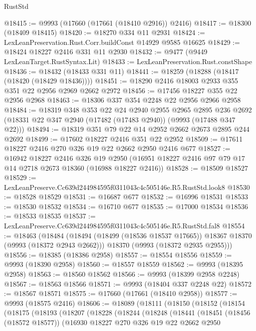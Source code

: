 \begin{lexlean}{RustStd}
\begin{coremodule}
@18415 := @9993 (@17660 (@17661 (@18410 @2916)) @2416)
@18417 := @18300 (@18409 @18415)
@18420 := @18270 @334 @11 @2931
@18424 := LexLeanPreservation.Rust.Corr.buildConst @14929 @9585 @16625
@18429 := @18424 @18227 @2416 @331 @11 @2930
@18432 := @9477 (@9449 LexLeanTarget.RustSyntax.Lit)
@18433 := LexLeanPreservation.Rust.constShape
@18436 := @18432 (@18433 @331 @11)
@18441 := @18259 (@18288 (@18417 (@18420 (@18429 @18436))))
@18451 := @18290 @2416 @18003 @2933 @355 @351 @22 @2956 @2969 @2662 @2972
@18456 := @17456 @18227 @355 @22 @2956 @2968
@18463 := @18306 @337 @354 @2248 @22 @2956 @2966 @2958
@18484 := @18319
    @348
    @353
    @22
    @24
    @2940
    @2955
    @2965
    @2895
    @236
    @2692
    (@18331 @22 @347 @2940 (@17482 (@17483 @2940)) (@9993 (@17488 @347 @22)))
@18494 := @18319 @351 @79 @22 @14 @2952 @2662 @2673 @2895 @244 @2692
@18499 := @17602 @18227 @2416 @351 @22 @2952
@18509 := @17611 @18227 @2416 @270 @326 @19 @22 @2662 @2950 @2416 @677
@18527 := @16942
    @18227
    @2416
    @326
    @19
    @2950
    (@16951 @18227 @2416 @97 @79 @17 @14 @2718 @2673 @18360 (@16988 @18227 @2416))
@18528 := @18509 @18527
@18529 := LexLeanPreserve.Cc639d244984595f0311043c4c505146e.R5.RustStd.look8
@18530 := @18528 @18529
@18531 := @16687 @677
@18532 := @16996 @18531
@18533 := @18530 @18532
@18534 := @16710 @677
@18535 := @17000 @18534
@18536 := @18533 @18535
@18537 := LexLeanPreserve.Cc639d244984595f0311043c4c505146e.R5.RustStd.fal8
@18554 := @18463
    (@18484
      (@18494 (@18499 (@18536 @18537 @17665)) @18367 @18370 (@9993 (@18372 @2943 @2662)))
      @18370
      (@9993 (@18372 @2935 @2955)))
@18556 := @18385 (@18386 @2958)
@18557 := @18554 @18556
@18559 := @9993 (@18390 @2958)
@18560 := @18557 @18559
@18562 := @9993 (@18395 @2958)
@18563 := @18560 @18562
@18566 := @9993 (@18399 @2958 @2248)
@18567 := @18563 @18566
@18571 := @9993 (@18404 @337 @2248 @22)
@18572 := @18567 @18571
@18575 := @17660 (@17661 (@18410 @2958))
@18577 := @9993 (@18575 @2416)
@18606 := @18089
    (@18111
      (@18150
        (@18152
          (@18154
            (@18175
              (@18193
                (@18207
                  (@18228
                    (@18244
                      (@18248
                        (@18441
                          (@18451
                            (@18456 (@18572 @18577))
                            (@16930
                              @18227
                              @270
                              @326
                              @19
                              @22
                              @2662
                              @2950

\end{coremodule}
\end{lexlean}
